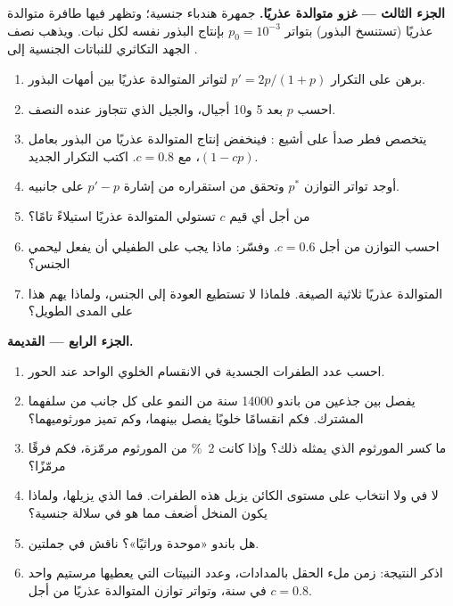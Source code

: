 \begin{problem}
\medskip
\noindent\textbf{الجزء الثالث --- غزو متوالدة عذريًا.}
جمهرة هندباء جنسية؛ وتظهر فيها طافرة متوالدة عذريًا (تستنسخ البذور)
بتواتر $p_0 = 10^{-3}$ بإنتاج البذور نفسه لكل نبات.
ويذهب نصف الجهد التكاثري للنباتات الجنسية إلى .
\begin{enumerate}[resume]
  \item برهن على التكرار $p' = 2p/(1 + p)$ لتواتر المتوالدة عذريًا
        بين أمهات البذور.
  \item احسب $p$ بعد 5 و10 أجيال، والجيل الذي تتجاوز عنده النصف.
  \item يتخصص فطر صدأ على أشيع : فينخفض إنتاج المتوالدة
        عذريًا من البذور بعامل $(1 - cp)$، مع
        $c = 0.8$. اكتب التكرار الجديد.
  \item أوجد تواتر التوازن $p^*$ وتحقق من استقراره
        من إشارة $p' - p$ على جانبيه.
  \item من أجل أي قيم $c$ تستولي المتوالدة عذريًا استيلاءً تامًا؟
  \item احسب التوازن من أجل $c = 0.6$. وفسّر: ماذا يجب على الطفيلي
        أن يفعل ليحمي الجنس؟
  \item المتوالدة عذريًا ثلاثية الصيغة. فلماذا لا تستطيع العودة إلى
        الجنس، ولماذا يهم هذا على المدى الطويل؟
\end{enumerate}

\medskip
\noindent\textbf{الجزء الرابع ---  القديمة.}
\begin{enumerate}[resume]
  \item احسب عدد الطفرات الجسدية في الانقسام الخلوي الواحد عند
        الحور.
  \item يفصل بين جذعين من  باندو \num{14000}
        سنة من النمو على كل جانب من سلفهما المشترك. فكم انقسامًا
        خلويًا يفصل بينهما، وكم  تميز مورثوميهما؟
  \item ما كسر المورثوم الذي يمثله ذلك؟ وإذا كانت \qty{2}{\%} من
        المورثوم مرمّزة، فكم فرقًا مرمّزًا؟
  \item لا  في  ولا انتخاب على مستوى الكائن يزيل
        هذه الطفرات. فما الذي يزيلها، ولماذا يكون المنخل أضعف مما
        هو في سلالة جنسية؟
  \item هل باندو «موحدة وراثيًا»؟ ناقش في جملتين.
  \item اذكر النتيجة: زمن ملء الحقل بالمدادات، وعدد النبيتات التي
        يعطيها مرستيم واحد في سنة، وتواتر توازن المتوالدة عذريًا من
        أجل $c = 0.8$.
\end{enumerate}
\end{problem}
